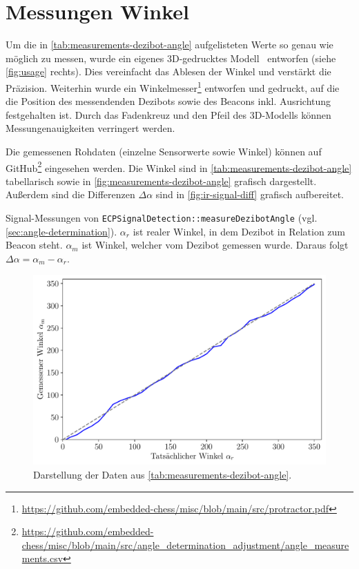 
\section{Messungen Winkel}
\label{sec:measurements-dezibot-angle}

Um die in \autoref{tab:measurements-dezibot-angle} aufgelisteten Werte so genau wie möglich zu messen, wurde ein eigenes 3D\hyphen gedrucktes Modell~\cite{felttipDezibotAlignmentPointer2025} entworfen (siehe \autoref{fig:usage} rechts). Dies vereinfacht das Ablesen der Winkel und verstärkt die Präzision. Weiterhin wurde ein Winkelmesser\footnote{\url{https://github.com/embedded-chess/misc/blob/main/src/protractor.pdf}} entworfen und gedruckt, auf die die Position des messendenden Dezibots sowie des Beacons inkl. Ausrichtung festgehalten ist. Durch das Fadenkreuz und den Pfeil des 3D-Modells können Messungenauigkeiten verringert werden.

Die gemessenen Rohdaten (einzelne Sensorwerte sowie Winkel) können auf GitHub\footnote{\url{https://github.com/embedded-chess/misc/blob/main/src/angle_determination_adjustment/angle_measurements.csv}} eingesehen werden. Die Winkel sind in \autoref{tab:measurements-dezibot-angle} tabellarisch sowie in \autoref{fig:measurements-dezibot-angle} grafisch dargestellt. Außerdem sind die Differenzen $\Delta\alpha$ sind in \autoref{fig:ir-signal-diff} grafisch aufbereitet.

\begin{table}[h!]
    \centering
    
    \caption{Signal-Messungen von \texttt{ECP\-Signal\-Detection::measure\-Dezibot\-Angle} (vgl. \autoref{sec:angle-determination}). $\alpha_r$ ist realer Winkel, in dem Dezibot in Relation zum Beacon steht. $\alpha_m$ ist Winkel, welcher vom Dezibot gemessen wurde. Daraus folgt $\Delta\alpha=\alpha_m - \alpha_r$.}
    \label{tab:measurements-dezibot-angle}
\end{table}

\begin{figure}[h]
    \centering
    \includegraphics[width=\textwidth]{../plot/ir_signal_comparison.pdf}
    \caption{Darstellung der Daten aus \autoref{tab:measurements-dezibot-angle}.}
    \label{fig:measurements-dezibot-angle}
\end{figure}


